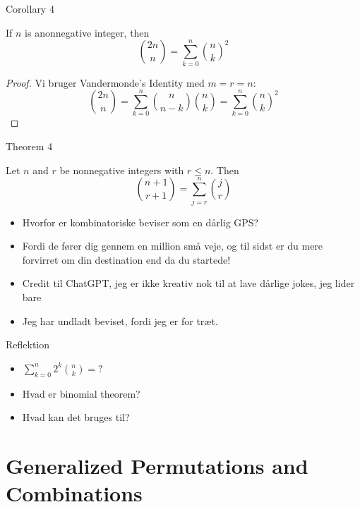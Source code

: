 \documentclass{beamer}
\begin{document}
\begin{frame}{Corollary 4}
   \begin{corollary}[Corollary 4]
      If $n$ is anonnegative integer, then $$\binom{2n}{n} = \sum^n_{k=0} \binom{n}{k}^2$$ 
   \end{corollary} 
   \begin{proof}
       Vi bruger Vandermonde's Identity med $m = r = n$:
       $$\binom{2n}{n} = \sum^n_{k=0} \binom{n}{n-k}\binom{n}{k} = \sum^n_{k=0}\binom{n}{k}^2$$
   \end{proof}
\end{frame}

\begin{frame}{Theorem 4}
\begin{theorem}[Theorem 4]
    Let $n$ and $r$ be nonnegative integers with $r \leq n$. Then
    $$\binom{n+1}{r+1} = \sum^n_{j=r}\binom{j}{r}$$
\end{theorem}
\begin{itemize}
    \item<1-> Hvorfor er kombinatoriske beviser som en dårlig GPS?
    \item<2-> Fordi de fører dig gennem en million små veje, og til sidst er du mere forvirret om din destination end da du startede!
    \item<3-> Credit til ChatGPT, jeg er ikke kreativ nok til at lave dårlige jokes, jeg lider bare
    \item<3-> Jeg har undladt beviset, fordi jeg er for træt.
\end{itemize}    
\end{frame}

\begin{frame}{Reflektion}
   \begin{itemize}
       \item $\sum^n_{k=0}2^k \binom{n}{k} = ?$
       \item Hvad er binomial theorem? 
        \item Hvad kan det bruges til? 
        
   \end{itemize} 
\end{frame}

\section{Generalized Permutations and Combinations}
\end{document}
